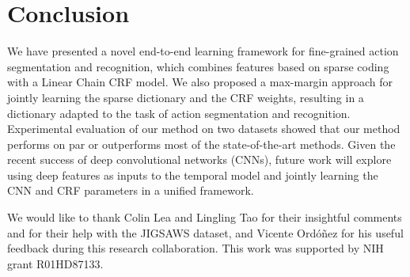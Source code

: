 \documentclass[10pt,twocolumn,letterpaper]{article}
\begin{document}
\vspace{-2mm}
\section{Conclusion}
We have presented a novel end-to-end learning framework for fine-grained action segmentation and recognition, which combines features based on sparse coding with a Linear Chain CRF model. We also proposed a max-margin approach for jointly learning the sparse dictionary and the CRF weights, resulting in a dictionary adapted to the task of action segmentation and recognition. Experimental evaluation of our method on two datasets showed that our method performs on par or outperforms most of the state-of-the-art methods. 
Given the recent success of deep convolutional networks (CNNs), future work will explore using deep features as inputs to the temporal model and jointly learning the CNN and CRF parameters in a unified framework.

We would like to thank Colin Lea and Lingling Tao for their insightful comments and for their help with the JIGSAWS dataset, and Vicente Ord\'o\~nez for his useful feedback during this research collaboration. This work was supported by NIH grant R01HD87133.

{\small


}
\end{document}
